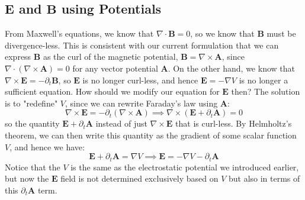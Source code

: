 \subsection{\( \mathbf{E} \) and \( \mathbf{B} \) using Potentials}
From Maxwell's equations, we know that \( \nabla \cdot \mathbf{B} = 0 \), so we know that \( \mathbf{B} \)
must be divergence-less. This is consistent with our current formulation that we can express \( \mathbf{B} \)
as the curl of the magnetic potential, \( \mathbf{B} = \nabla \times \mathbf{A} \), since \( \nabla
\cdot(\nabla \times \mathbf{A}) = 0 \) for any vector potential \( \mathbf{A} \). On the other hand, we know
that \( \nabla \times \mathbf{E} = -\partial_t \mathbf{B} \), so \( \mathbf{E} \) is no longer curl-less, and
hence \( \mathbf{E} = -\nabla V	\) is no longer a sufficient equation. How should we modify our equation for
\( \mathbf{E} \) then? The solution is to "redefine" \( V \), since we can rewrite Faraday's law using \(
\mathbf{A} \):
\[
	\nabla \times \mathbf{E} = -\partial_t(\nabla \times \mathbf{A}) \implies \nabla \times (\mathbf{E} +
	\partial_t \mathbf{A}) = 0
\]
so the quantity \( \mathbf{E} + \partial_t \mathbf{A} \) instead of just \( \nabla \times \mathbf{E} \) that
is curl-less. By Helmholtz's theorem, we can then write this quantity as the gradient of some scalar function
\( V \), and hence we have:
\[
	\mathbf{E} + \partial_t \mathbf{A} = \nabla V \implies \mathbf{E} = -\nabla V - \partial_t \mathbf{A}
\]
Notice that the \( V \) is the same as the electrostatic potential we introduced earlier, but now the \(
\mathbf{E} \) field is not determined exclusively based on \( V \) but also in terms of this \( \partial_t
\mathbf{A} \) term.

